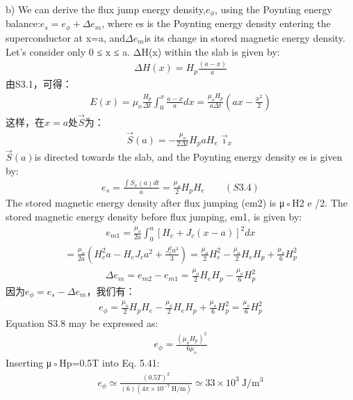 b) We can derive the flux jump energy density,$e_{\phi}$, using the Poynting energy
balance:$e_s=e_{\phi}+\Delta e_m$, where es is the Poynting energy density entering the
superconductor at x=a, and$\Delta e_m$is its change in stored magnetic energy density.
Let’s consider only 0 ≤ x ≤ a. ΔH(x) within the slab is given by:
\begin{align*}%
\Delta H(x)=H_{p}\frac{(a-x)}{a}\tag{S3.1}
\end{align*}
由S3.1，可得：
\begin{align*}%
E(x)=\mu_{o}\frac{H_{p}}{\Delta t}\int_{0}^{x}\frac{a-x}{a}dx=\frac{\mu_{o}H_{p}}{a\Delta t}(ax-\frac{x^{2}}{2})\tag{S3.2}
\end{align*}
这样，在$x=a$处$\vec{S}$为：
\begin{align*}%
\vec{S}(a)=-\frac{\mu_{o}}{2\Delta t}H_{p}aH_{e}\vec{\imath}_{x}\tag{S3.3}
\end{align*}
$\vec{S}(a)$is directed towards the slab, and the Poynting energy density es is given by:
\begin{align*}%
e_{s}=\frac{\int S_{x}(a)dt}{a}=\frac{\mu_{o}}{2}H_{p}H_{e}\qquad(S3.4)
\end{align*}
The stored magnetic energy density after flux jumping (em2) is μ◦H2
e /2. The stored magnetic energy density before flux jumping, em1, is given by:
\begin{align*}%
e_{m1}=\frac{\mu_{o}}{2a}\int_{0}^{a}[H_{e}+J_{c}(x-a)]^{2}dx\tag{S3.5}
\end{align*}
\begin{align*}%
=\frac{\mu_{o}}{2a}(H_{e}^{2}a-H_{e}J_{c}a^{2}+\frac{J_{c}^{2}a^{3}}{3})=\frac{\mu_{o}}{2}H_{e}^{2}-\frac{\mu_{o}}{2}H_{e}H_{p}+\frac{\mu_{o}}{6}H_{p}^{2}\tag{S3.6}
\end{align*}
\begin{align*}%
\Delta e_{m}=e_{m2}-e_{m1}=\frac{\mu_{o}}{2}H_{e}H_{p}-\frac{\mu_{o}}{6}H_{p}^{2}\tag{S3.7}
\end{align*}
因为$e_\phi=e_s-\Delta e_m$，我们有：
\begin{align*}%
e_{\phi}=\frac{\mu_{o}}{2}H_{p}H_{e}-\frac{\mu_{o}}{2}H_{e}H_{p}+\frac{\mu_{o}}{6}H_{p}^{2}=\frac{\mu_{o}}{6}H_{p}^{2}\tag{S3.8}
\end{align*}
Equation S3.8 may be expressed as:
\begin{align*}%
e_{\phi}=\frac{(\mu_{o}H_{p})^{2}}{6\mu_{o}}\tag{5.41}
\end{align*}
Inserting μ◦Hp=0.5T into Eq. 5.41:
\begin{align*}%
e_{\phi}\simeq\frac{(0.5T)^{2}}{(6)(4\pi\times10^{-7}\ \mathrm{H/m})}\simeq33\times10^{3}\ \mathrm{J/m^{3}}
\end{align*}

